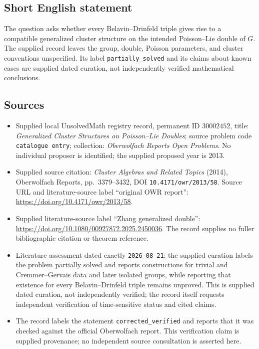 \documentclass[11pt]{article}
\begin{document}
\subsection{Short English statement}
The question asks whether every Belavin--Drinfeld triple gives rise to a compatible generalized cluster structure on the intended Poisson--Lie double of \(G\). The supplied record leaves the group, double, Poisson parameters, and cluster conventions unspecified. Its label \texttt{partially\_solved} and its claims about known cases are supplied dated curation, not independently verified mathematical conclusions.
\subsection{Sources}
\begin{itemize}
\item Supplied local UnsolvedMath registry record, permanent ID \(30002452\), title: \emph{Generalized Cluster Structures on Poisson--Lie Doubles}; source problem code \texttt{catalogue entry}; collection: \emph{Oberwolfach Reports Open Problems}. No individual proposer is identified; the supplied proposed year is 2013.
\item Supplied source citation: \emph{Cluster Algebras and Related Topics} (2014), Oberwolfach Reports, pp.~3379--3432, DOI \texttt{10.4171/owr/2013/58}. Source URL and literature-source label ``original OWR report'': \url{https://doi.org/10.4171/owr/2013/58}.
\item Supplied literature-source label ``Zhang generalized double'': \url{https://doi.org/10.1080/00927872.2025.2450036}. The record supplies no fuller bibliographic citation or theorem reference.
\item Literature assessment dated exactly \texttt{2026-08-21}: the supplied curation labels the problem partially solved and reports constructions for trivial and Cremmer--Gervais data and later isolated groups, while reporting that existence for every Belavin--Drinfeld triple remains unproved. This is supplied dated curation, not independently verified; the record itself requests independent verification of time-sensitive status and cited claims.
\item The record labels the statement \texttt{corrected\_verified} and reports that it was checked against the official Oberwolfach report. This verification claim is supplied provenance; no independent source consultation is asserted here.
\end{itemize}
\end{document}
